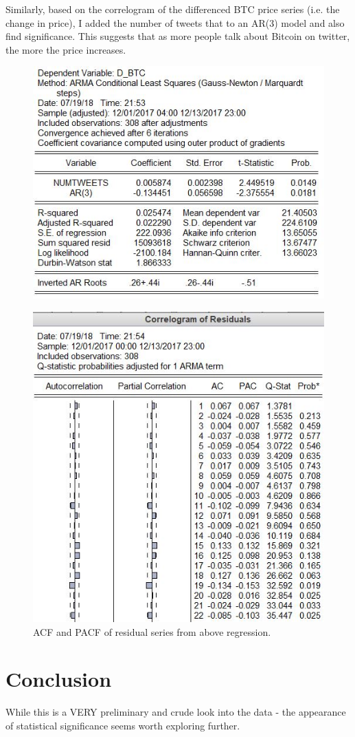 \documentclass{article}
\begin{document}
	
	Similarly, based on the correlogram of the differenced BTC price series (i.e. the change in price), I added the number of tweets that to an AR(3) model and also find significance. This suggests that as more people talk about Bitcoin on twitter, the more the price increases. 
	
	\begin{figure}[H]
	\centering
	\includegraphics[width = .9\textwidth]{dBtcRegResults.JPG}
	\end{figure}
	
	
	\begin{figure}[H]
	\centering
	\includegraphics[width = .9\textwidth]{dBtc_ACF.JPG}
	\caption{ACF and PACF of residual series from above regression.}
	\end{figure}
	
	\section{Conclusion}
	
	While this is a VERY preliminary and crude look into the data - the appearance of statistical significance seems worth exploring further. 
	
\end{document}
